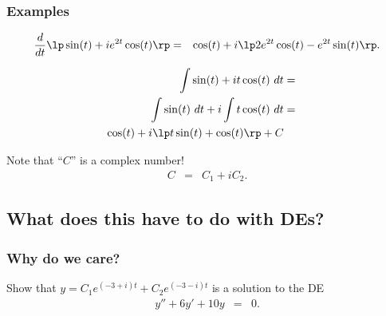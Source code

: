 \begin{frame}
  \frametitle{Examples}

  \begin{eqnarray*}
    \frac{d}{dt} \lp \sin(t) + i e^{2t} \cos(t) \rp & = & 
    \cos(t) + i \lp 2 e^{2t} \cos(t) - e^{2t} \sin(t) \rp.
  \end{eqnarray*}

  \begin{eqnarray*}
    \int \sin(t) + i t \cos(t) ~ dt & = & \\
    \int \sin(t) ~ dt + i \int t \cos(t) ~ dt &=& \\
    \cos(t) + i \lp t\sin(t) + \cos(t) \rp + C & &
  \end{eqnarray*}

  Note that ``$C$'' is a complex number!
  \begin{eqnarray*}
    C & = & C_1 + i C_2.
  \end{eqnarray*}

\end{frame}

\subsection{What does this have to do with DEs?}

\begin{frame}
  \frametitle{Why do we care?}

  Show that $y=C_1 e^{(-3+i)t} + C_2 e^{(-3-i)t}$ is a solution to the DE
  \begin{eqnarray*}
    y'' + 6y' + 10y & = & 0.
  \end{eqnarray*}

\end{frame}




